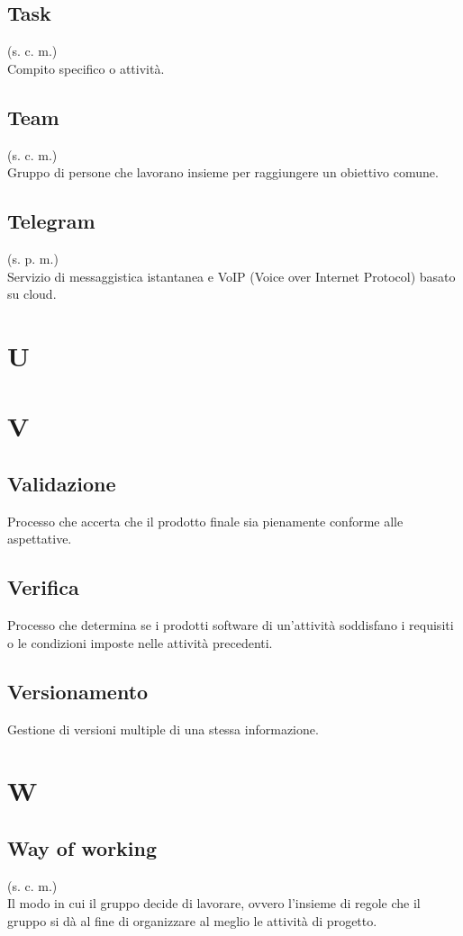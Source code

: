     \subsection{Task}
    (s. c. m.)\\
    Compito specifico o attività.
    \subsection{Team}
    (s. c. m.)\\
    \label{Team}
    Gruppo di persone che lavorano insieme per raggiungere un obiettivo comune.
    \subsection{Telegram}
    (s. p. m.)\\
    Servizio di messaggistica istantanea e VoIP (Voice over Internet Protocol)
    basato su cloud.
\pagebreak
\section{U}
\pagebreak
\section{V}
    \subsection{Validazione}
    Processo che accerta che il prodotto finale sia pienamente conforme alle aspettative.
    \subsection{Verifica}
    Processo che determina se i prodotti software di un'attività soddisfano
    i requisiti o le condizioni imposte nelle attività precedenti.
    \subsection{Versionamento}
    Gestione di versioni multiple di una stessa informazione.
\pagebreak
\section{W}
    \subsection{Way of working}
    \label{Way of working}
    (s. c. m.)\\
    Il modo in cui il gruppo decide di lavorare, ovvero l'insieme di regole 
    che il gruppo si dà al fine di organizzare al meglio le attività di progetto.
